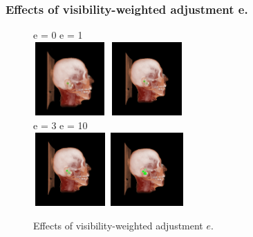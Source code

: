 \documentclass{beamer}
\begin{document}


\begin{frame}
\frametitle{Effects of visibility-weighted adjustment e. }
\begin{figure}
\centering
e = 0    \hspace{50pt}      e = 1 \\
\vspace{3pt}
\includegraphics[width=80pt,height=80pt]{i=0.png}
\includegraphics[width=80pt,height=80pt]{i=1.png}\\
e = 3    \hspace{50pt}      e = 10 \\
\vspace{3pt}
\includegraphics[width=80pt,height=80pt]{i=3.png}
\includegraphics[width=80pt,height=80pt]{i=10.png}
\caption{Effects of visibility-weighted adjustment $e$. }
\end{figure}
\end{frame}
\end{document}
